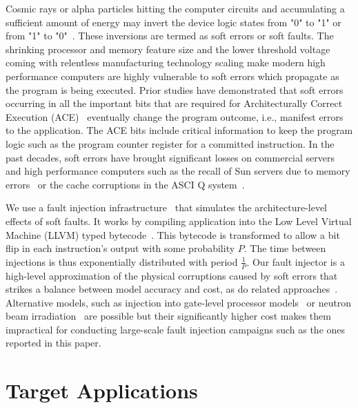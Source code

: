 \documentclass{sig-alternate}
\begin{document}
Cosmic rays or alpha particles hitting the computer circuits and accumulating a sufficient amount of energy may invert the device logic states from "0" to "1" or from "1" to "0"~\cite{ibm_softerr:1996,baumann:2005}.
These inversions are termed as soft errors or soft faults.
The shrinking processor and memory feature size and the lower threshold voltage coming with relentless manufacturing technology scaling make modern high performance computers are highly vulnerable to soft errors which propagate as the program is being executed.
Prior studies have demonstrated that soft errors occurring in all the important bits that are required for Architecturally Correct Execution (ACE)~\cite{avf:2003} eventually change the program outcome, i.e., manifest errors to the application.
The ACE bits include critical information to keep the program logic such as the program counter register for a committed instruction.
In the past decades, soft errors have brought significant losses on commercial servers and high performance computers such as the recall of Sun servers due to memory errors~\cite{SoftErr:Baumann:2002} or the cache corruptions in the ASCI Q system~\cite{asciQSER:2005}.


We use a fault injection infrastructure~\cite{relax:2010} that simulates the architecture-level effects of soft faults.
It works by compiling application into the Low Level Virtual Machine (LLVM) typed bytecode~\cite{LLVM}.
This bytecode is transformed to allow a bit flip in each instruction's output with some probability $P$.
The time between injections is thus exponentially distributed with period $\frac{1}{P}$.
Our fault injector is a high-level approximation of the physical corruptions caused by soft errors that strikes a balance between model accuracy and cost, as do related approaches~\cite{fault_injection:iyer:1997, avf:2003}.
Alternative models, such as injection into gate-level processor models~\cite{sesee:2004} or neutron beam irradiation~\cite{freq_dep:irom:2004} are possible but their significantly higher cost makes them impractical for conducting large-scale fault injection campaigns such as the ones reported in this paper.

\section{Target Applications}
\label{sec:apps}
\end{document}
